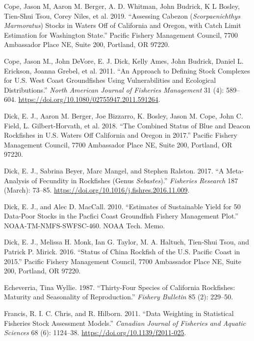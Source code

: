 \documentclass[11pt,
  english,
  a4paper,
]{article}
\begin{document}
\leavevmode\hypertarget{ref-cope_cabezon_2019}{}%
Cope, Jason M, Aaron M. Berger, A. D. Whitman, John Budrick, K L Bosley, Tien-Shui Tsou, Corey Niles, et al. 2019. ``Assessing Cabezon (\emph{Scorpaenichthys Marmoratus}) Stocks in Waters Off of California and Oregon, with Catch Limit Estimation for Washington State.'' Pacific Fishery Management Council, 7700 Ambassador Place NE, Suite 200, Portland, OR 97220.

\leavevmode\hypertarget{ref-cope_approach_2011}{}%
Cope, Jason M., John DeVore, E. J. Dick, Kelly Ames, John Budrick, Daniel L. Erickson, Joanna Grebel, et al. 2011. ``An Approach to Defining Stock Complexes for U.S. West Coast Groundfishes Using Vulnerabilities and Ecological Distributions.'' \emph{North American Journal of Fisheries Management} 31 (4): 589--604. \url{https://doi.org/10.1080/02755947.2011.591264}.

\leavevmode\hypertarget{ref-dick_bluedeacon_2018}{}%
Dick, E. J., Aaron M. Berger, Joe Bizzarro, K. Bosley, Jason M. Cope, John C. Field, L. Gilbert-Horvath, et al. 2018. ``The Combined Status of Blue and Deacon Rockfishes in U.S. Waters Off California and Oregon in 2017.'' Pacific Fishery Management Council, 7700 Ambassador Place NE, Suite 200, Portland, OR 97220.

\leavevmode\hypertarget{ref-dick_meta-analysis_2017}{}%
Dick, E. J., Sabrina Beyer, Marc Mangel, and Stephen Ralston. 2017. ``A Meta-Analysis of Fecundity in Rockfishes (Genus \emph{Sebastes}).'' \emph{Fisheries Research} 187 (March): 73--85. \url{https://doi.org/10.1016/j.fishres.2016.11.009}.

\leavevmode\hypertarget{ref-DickandMacCall_dbsra_2010}{}%
Dick, E. J., and Alec D. MacCall. 2010. ``Estimates of Sustainable Yield for 50 Data-Poor Stocks in the Pacfici Coast Groundfish Fishery Management Plot.'' NOAA-TM-NMFS-SWFSC-460. NOAA Tech. Memo.

\leavevmode\hypertarget{ref-dick_china_2016}{}%
Dick, E. J., Melissa H. Monk, Ian G. Taylor, M. A. Haltuch, Tien-Shui Tsou, and Patrick P. Mirick. 2016. ``Status of China Rockfish of the U.S. Pacific Coast in 2015.'' Pacific Fishery Management Council, 7700 Ambassador Place NE, Suite 200, Portland, OR 97220.

\leavevmode\hypertarget{ref-Echeverria_maturity_1987}{}%
Echeverria, Tina Wyllie. 1987. ``Thirty-Four Species of California Rockfishes: Maturity and Seasonality of Reproduction.'' \emph{Fishery Bulletin} 85 (2): 229--50.

\leavevmode\hypertarget{ref-francis_data_2011}{}%
Francis, R. I. C. Chris, and R. Hilborn. 2011. ``Data Weighting in Statistical Fisheries Stock Assessment Models.'' \emph{Canadian Journal of Fisheries and Aquatic Sciences} 68 (6): 1124--38. \url{https://doi.org/10.1139/f2011-025}.
\end{document}
